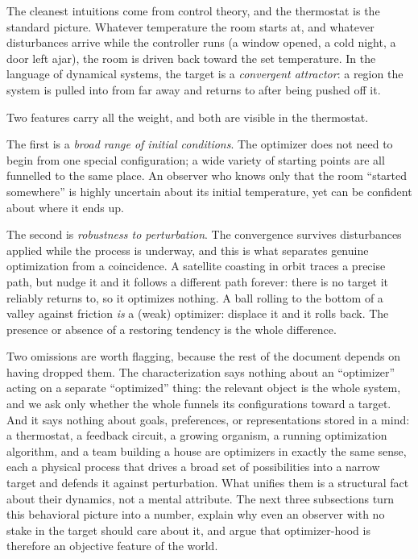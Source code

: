 \documentclass[10pt]{article}
\theoremstyle{definition}
\theoremstyle{remark}
\begin{document}
The cleanest intuitions come from control theory, and the thermostat is the standard picture. Whatever temperature the room starts at, and whatever disturbances arrive while the controller runs (a window opened, a cold night, a door left ajar), the room is driven back toward the set temperature. In the language of dynamical systems, the target is a \emph{convergent attractor}: a region the system is pulled into from far away and returns to after being pushed off it.

Two features carry all the weight, and both are visible in the thermostat.

The first is a \emph{broad range of initial conditions}. The optimizer does not need to begin from one special configuration; a wide variety of starting points are all funnelled to the same place. An observer who knows only that the room ``started somewhere'' is highly uncertain about its initial temperature, yet can be confident about where it ends up.

The second is \emph{robustness to perturbation}. The convergence survives disturbances applied while the process is underway, and this is what separates genuine optimization from a coincidence. A satellite coasting in orbit traces a precise path, but nudge it and it follows a different path forever: there is no target it reliably returns to, so it optimizes nothing. A ball rolling to the bottom of a valley against friction \emph{is} a (weak) optimizer: displace it and it rolls back. The presence or absence of a restoring tendency is the whole difference.

Two omissions are worth flagging, because the rest of the document depends on having dropped them. The characterization says nothing about an ``optimizer'' acting on a separate ``optimized'' thing: the relevant object is the whole system, and we ask only whether the whole funnels its configurations toward a target. And it says nothing about goals, preferences, or representations stored in a mind: a thermostat, a feedback circuit, a growing organism, a running optimization algorithm, and a team building a house are optimizers in exactly the same sense, each a physical process that drives a broad set of possibilities into a narrow target and defends it against perturbation. What unifies them is a structural fact about their dynamics, not a mental attribute. The next three subsections turn this behavioral picture into a number, explain why even an observer with no stake in the target should care about it, and argue that optimizer-hood is therefore an objective feature of the world.
\end{document}
